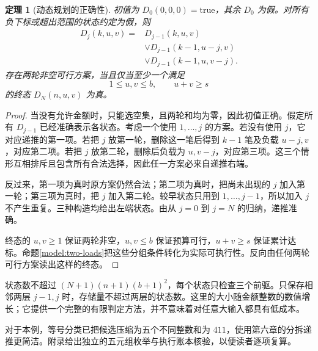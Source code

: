 \documentclass[UTF8,a4paper]{ctexbook}
\newtheorem{theorem}{定理}[chapter]
\theoremstyle{definition}
\numberwithin{equation}{chapter}
\newcommand{\1}{\mathbf{1}}
\begin{document}
\begin{theorem}[动态规划的正确性]\label{gen:dp}
初值为 $D_0(0,0,0)=\mathrm{true}$，其余 $D_0$ 为假。对所有负下标或超出范围的状态约定为假，则
\begin{equation}\label{gen:dp-recursion}
\begin{split}
D_j(k,u,v)={}&D_{j-1}(k,u,v)\\
&\lor D_{j-1}(k-1,u-j,v)\\
&\lor D_{j-1}(k-1,u,v-j).
\end{split}
\end{equation}
存在两轮非空可行方案，当且仅当至少一个满足
\[
1\le u,v\le b,\qquad u+v\ge s
\]
的终态 $D_N(n,u,v)$ 为真。
\end{theorem}
\begin{proof}
当没有允许金额时，只能选空集，且两轮和均为零，因此初值正确。假定所有 $D_{j-1}$ 已经准确表示各状态。考虑一个使用 $1,\ldots,j$ 的方案。若没有使用 $j$，它对应递推的第一项。若把 $j$ 放第一轮，删除这一笔后得到 $k-1$ 笔及负载 $u-j,v$，对应第二项。若把 $j$ 放第二轮，删除后负载为 $u,v-j$，对应第三项。这三个情形互相排斥且包含所有合法选择，因此任一方案必来自递推右端。

反过来，第一项为真时原方案仍然合法；第二项为真时，把尚未出现的 $j$ 加入第一轮；第三项为真时，把 $j$ 加入第二轮。较早状态只用到 $1,\ldots,j-1$，所以加入 $j$ 不产生重复。三种构造均给出左端状态。由从 $j=0$ 到 $j=N$ 的归纳，递推准确。

终态的 $u,v\ge1$ 保证两轮非空，$u,v\le b$ 保证预算可行，$u+v\ge s$ 保证累计达标。命题\ref{model:two-loads}把这些分组条件转化为实际可执行性。反向由任何两轮可行方案读出这样的终态。
\end{proof}

状态数不超过 $(N+1)(n+1)(b+1)^2$，每个状态只检查三个前驱。只保存相邻两层 $j-1,j$ 时，存储量不超过两层的状态数。这里的大小随金额整数的数值增长；它提供一个完整的有限判定方法，并不意味着对任意大输入都具有低成本。

对于本例，等号分类已把候选压缩为五个不同整数和为 $411$，使用第六章的分拆递推更简洁。附录给出独立的五元组枚举与执行账本核验，以便读者逐项复算。

\clearpage
\end{document}
